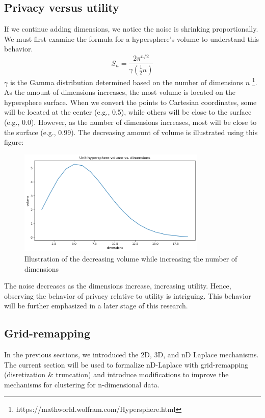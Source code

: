 \subsection{Privacy versus utility} \label{theory:privacy-utility-nd}
If we continue adding dimensions, we notice the noise is shrinking proportionally.
We must first examine the formula for a hypersphere’s volume to understand this behavior.
\begin{equation}
  S_n = \frac{2 \pi^{n/2}}{\gamma(\frac{1}{2}n)}
\end{equation}
$\gamma$ is the Gamma distribution determined based on the number of dimensions $n$ \footnote{https://mathworld.wolfram.com/Hypersphere.html}.
As the amount of dimensions increases, the most volume is located on the hypersphere surface.
When we convert the points to Cartesian coordinates, some will be located at the center (e.g., 0.5), while others will be close to the surface (e.g., 0.0).
However, as the number of dimensions increases, most will be close to the surface (e.g., 0.99).
The decreasing amount of volume is illustrated using this figure:
\begin{figure}[H]
  \includegraphics[width=0.8\textwidth]{TheorethicalFramework/ND-Laplace/Images/volume.png}
  \caption{Illustration of the decreasing volume while increasing the number of dimensions}
  \label{fig:curse-of-dimensionality}
\end{figure}

The noise decreases as the dimensions increase, increasing utility.
Hence, observing the behavior of privacy relative to utility is intriguing.
This behavior will be further emphasized in a later stage of this research.
\newpage
\subsection{Grid-remapping}
In the previous sections, we introduced the 2D, 3D, and nD Laplace mechanisms.
The current section will be used to formalize nD-Laplace with grid-remapping (disretization \& truncation) and introduce modifications to improve the mechanisms for clustering for n-dimensional data.

